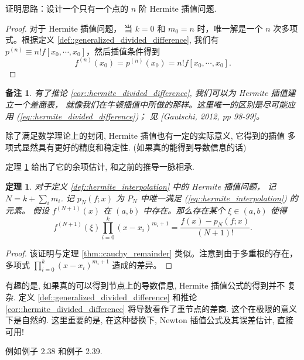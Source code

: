 \documentclass[a4paper]{ctexart}
\newtheorem{theorem}{定理}
\newtheorem{remark}{备注}
\numberwithin{theorem}{section}
\numberwithin{equation}{section}
\numberwithin{figure}{section}
\numberwithin{remark}{section}
\begin{document}
证明思路：设计一个只有一个点的 $n$ 阶 Hermite 插值问题.

\begin{proof}
对于 Hermite 插值问题，
当 $k = 0$ 和 $m_0 = n$ 时，唯一解是一个 $n$ 次多项式。根据定义 \ref{def::generalized_divided_difference}, 
我们有 $p^{(n)} \equiv n!f [x_0 , \cdots , x_0]$，然后插值条件得到
\[
f^{(n)} (x_0 ) = p^{(n)} (x_0 ) = n!f [x_0 , \cdots , x_0].
\]        
\end{proof}


\begin{remark}
有了推论 \ref{cor::hermite_divided_difference}, 我们可以为 Hermite 插值建立一个差商表，
就像我们在牛顿插值中所做的那样。这里唯一的区别是尽可能应用 (\ref{eq::hermite_divided_difference})；
见 [Gautschi, 2012, pp 98-99]。    
\end{remark}


除了满足数学理论上的封闭, Hermite 插值也有一定的实际意义, 它得到的插值
多项式显然具有更好的精度和稳定性. (如果真的能得到导数信息的话)

定理 \ref{thm::hermite_remainder} 给出了它的余项估计, 和之前的推导一脉相承.

\begin{theorem}
    \label{thm::hermite_remainder}
对于定义 \ref{def::hermite_interpolation} 中的 Hermite 插值问题，
记 $N = k + \sum_i m_i$. 记 $p_N(f ; x)$ 为 $P_N$ 中唯一满足 (\ref{eq::hermite_interpolation}) 的元素。
假设 $f^{(N+1)}(x)$ 在 $(a, b)$ 中存在。那么存在某个 $\xi \in (a, b)$ 使得
\begin{equation}
    \label{eq::hermite_remainder}
f^{(N+1)}(\xi) \prod_{i=0}^{k} (x - x_i)^{m_i + 1} 
= \frac{f(x) - p_N(f ; x)}{(N + 1)!}. 
\end{equation}    
\end{theorem}

\begin{proof}
该证明与定理 \ref{thm::cauchy_remainder} 类似。注意到由于多重根的存在，
多项式 $\prod_{i=0}^{k} (x - x_i)^{m_i + 1}$ 造成的差异。    
\end{proof}

有趣的是, 如果真的可以得到节点上的导数信息, Hermite 插值公式的得到并不
复杂. 定义 \ref{def::generalized_divided_difference} 和推论 \ref{cor::hermite_divided_difference} 将导数看作了重节点的差商. 
这个在极限的意义下是自然的. 
这里重要的是, 在这种替换下, Newton 插值公式及其误差估计, 直接可用!

例如例子 2.38 和例子 2.39.
\end{document}
